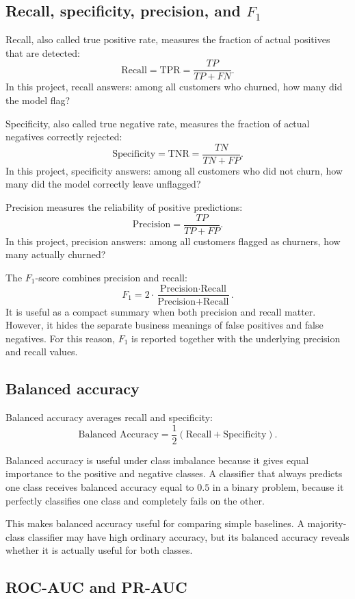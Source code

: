 \subsection{Recall, specificity, precision, and \(F_1\)}

Recall, also called true positive rate, measures the fraction of actual positives that are detected:
\[
\text{Recall}
=
\text{TPR}
=
\frac{TP}{TP+FN}.
\]
In this project, recall answers: among all customers who churned, how many did the model flag?

Specificity, also called true negative rate, measures the fraction of actual negatives correctly rejected:
\[
\text{Specificity}
=
\text{TNR}
=
\frac{TN}{TN+FP}.
\]
In this project, specificity answers: among all customers who did not churn, how many did the model correctly leave unflagged?

Precision measures the reliability of positive predictions:
\[
\text{Precision}
=
\frac{TP}{TP+FP}.
\]
In this project, precision answers: among all customers flagged as churners, how many actually churned?

The \(F_1\)-score combines precision and recall:
\[
F_1
=
2\cdot
\frac{\text{Precision}\cdot\text{Recall}}
{\text{Precision}+\text{Recall}}.
\]
It is useful as a compact summary when both precision and recall matter. However, it hides the separate business meanings of false positives and false negatives. For this reason, \(F_1\) is reported together with the underlying precision and recall values.

\subsection{Balanced accuracy}

Balanced accuracy averages recall and specificity:
\[
\text{Balanced Accuracy}
=
\frac{1}{2}
\left(
\text{Recall}+\text{Specificity}
\right).
\]

Balanced accuracy is useful under class imbalance because it gives equal importance to the positive and negative classes. A classifier that always predicts one class receives balanced accuracy equal to \(0.5\) in a binary problem, because it perfectly classifies one class and completely fails on the other.

This makes balanced accuracy useful for comparing simple baselines. A majority-class classifier may have high ordinary accuracy, but its balanced accuracy reveals whether it is actually useful for both classes.

\subsection{ROC-AUC and PR-AUC}

